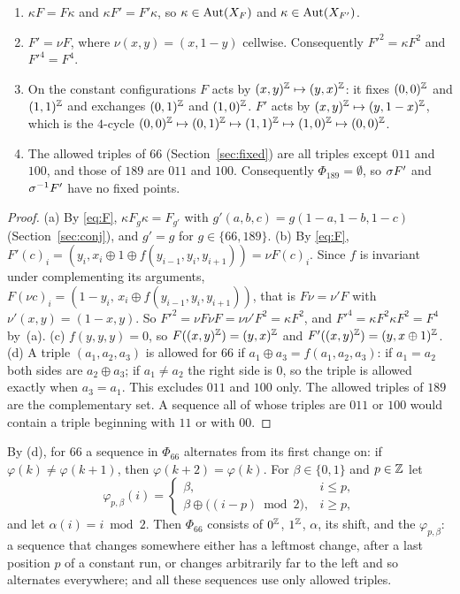 \begin{lemma}\label{c24:lem:rules}
\begin{enumerate}
\item[(a)] $\kappa F=F\kappa$ and $\kappa F'=F'\kappa$, so $\kappa\in\operatorname{Aut}(X_F)$ and $\kappa\in\operatorname{Aut}(X_{F'})$.
\item[(b)] $F'=\nu F$, where $\nu(x,y)=(x,1-y)$ cellwise. Consequently $F'^2=\kappa F^2$ and $F'^4=F^4$.
\item[(c)] On the constant configurations $F$ acts by $(x,y)^{\mathbb{Z}}\mapsto(y,x)^{\mathbb{Z}}$: it fixes $(0,0)^{\mathbb{Z}}$ and $(1,1)^{\mathbb{Z}}$ and exchanges $(0,1)^{\mathbb{Z}}$ and $(1,0)^{\mathbb{Z}}$. $F'$ acts by $(x,y)^{\mathbb{Z}}\mapsto(y,1-x)^{\mathbb{Z}}$, which is the $4$-cycle $(0,0)^{\mathbb{Z}}\mapsto(0,1)^{\mathbb{Z}}\mapsto(1,1)^{\mathbb{Z}}\mapsto(1,0)^{\mathbb{Z}}\mapsto(0,0)^{\mathbb{Z}}$.
\item[(d)] The allowed triples of $66$ (Section~\ref{sec:fixed}) are all triples except $011$ and $100$, and those of $189$ are $011$ and $100$. Consequently $\Phi_{189}=\emptyset$, so $\sigma F'$ and $\sigma^{-1}F'$ have no fixed points.
\end{enumerate}
\end{lemma}

\begin{proof}
(a) By \eqref{eq:F}, $\kappa F_g\kappa=F_{g'}$ with $g'(a,b,c)=g(1-a,1-b,1-c)$ (Section~\ref{sec:conj}), and $g'=g$ for $g\in\{66,189\}$. (b) By \eqref{eq:F}, $F'(c)_i=(y_i,x_i\oplus1\oplus f(y_{i-1},y_i,y_{i+1}))=\nu F(c)_i$. Since $f$ is invariant under complementing its arguments, $F(\nu c)_i=(1-y_i,\,x_i\oplus f(y_{i-1},y_i,y_{i+1}))$, that is $F\nu=\nu'F$ with $\nu'(x,y)=(1-x,y)$. So $F'^2=\nu F\nu F=\nu\nu'F^2=\kappa F^2$, and $F'^4=\kappa F^2\kappa F^2=F^4$ by~(a). (c) $f(y,y,y)=0$, so $F((x,y)^{\mathbb{Z}})=(y,x)^{\mathbb{Z}}$ and $F'((x,y)^{\mathbb{Z}})=(y,x\oplus1)^{\mathbb{Z}}$. (d) A triple $(a_1,a_2,a_3)$ is allowed for $66$ if $a_1\oplus a_3=f(a_1,a_2,a_3)$: if $a_1=a_2$ both sides are $a_2\oplus a_3$; if $a_1\ne a_2$ the right side is $0$, so the triple is allowed exactly when $a_3=a_1$. This excludes $011$ and $100$ only. The allowed triples of $189$ are the complementary set. A sequence all of whose triples are $011$ or $100$ would contain a triple beginning with $11$ or with $00$.
\end{proof}

By (d), for $66$ a sequence in $\Phi_{66}$ alternates from its first change on: if $\varphi(k)\ne\varphi(k+1)$, then $\varphi(k+2)=\varphi(k)$. For $\beta\in\{0,1\}$ and $p\in\mathbb{Z}$ let
\[
\varphi_{p,\beta}(i)=\begin{cases}\beta,&i\le p,\\ \beta\oplus\bigl((i-p)\bmod 2\bigr),&i\ge p,\end{cases}
\]
and let $\alpha(i)=i\bmod2$. Then $\Phi_{66}$ consists of $0^{\mathbb{Z}}$, $1^{\mathbb{Z}}$, $\alpha$, its shift, and the $\varphi_{p,\beta}$: a sequence that changes somewhere either has a leftmost change, after a last position $p$ of a constant run, or changes arbitrarily far to the left and so alternates everywhere; and all these sequences use only allowed triples.

